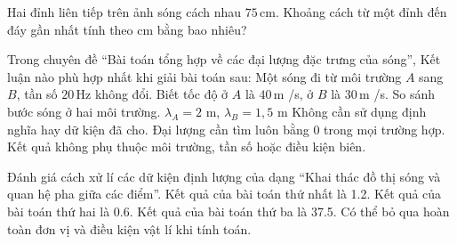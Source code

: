 \begin{ex}
Hai đỉnh liên tiếp trên ảnh sóng cách nhau $75\,\text{cm}$. Khoảng cách từ một đỉnh đến đáy gần nhất tính theo cm bằng bao nhiêu?
\end{ex}

\begin{ex}
Trong chuyên đề “Bài toán tổng hợp về các đại lượng đặc trưng của sóng”, Kết luận nào phù hợp nhất khi giải bài toán sau: Một sóng đi từ môi trường $A$ sang $B$, tần số $20\,\text{Hz}$ không đổi. Biết tốc độ ở $A$ là $40\,\text{m}$ /s, ở $B$ là $30\,\text{m}$ /s. So sánh bước sóng ở hai môi trường.
\choice
{\True $\lambda_A=2$ m, $\lambda_B=1,5$ m}
{Không cần sử dụng định nghĩa hay dữ kiện đã cho.}
{Đại lượng cần tìm luôn bằng 0 trong mọi trường hợp.}
{Kết quả không phụ thuộc môi trường, tần số hoặc điều kiện biên.}
\end{ex}

\begin{ex}
Đánh giá cách xử lí các dữ kiện định lượng của dạng “Khai thác đồ thị sóng và quan hệ pha giữa các điểm”.
\choiceTF
{\True Kết quả của bài toán thứ nhất là 1.2.}
{\True Kết quả của bài toán thứ hai là 0.6.}
{\True Kết quả của bài toán thứ ba là 37.5.}
{Có thể bỏ qua hoàn toàn đơn vị và điều kiện vật lí khi tính toán.}
\end{ex}

